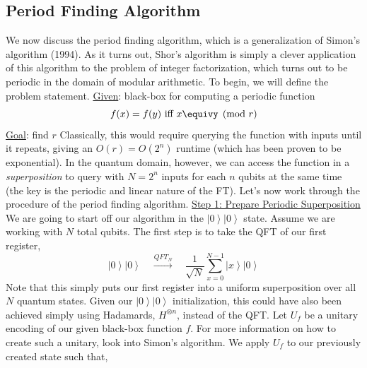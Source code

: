 \documentclass[11pt]{article} %
\newcommand{\ket}[1]{\left|#1\right\rangle}
\begin{document}
\subsection{Period Finding Algorithm}
We now discuss the period finding algorithm, which is a generalization of Simon's algorithm (1994). As it turns out, Shor's algorithm is simply a clever application of this algorithm to the problem of integer factorization, which turns out to be periodic in the domain of modular arithmetic. To begin, we will define the problem statement.
\newline\newline
\underline{Given}: black-box for computing a periodic function
\begin{equation*}
    f(x)=f(y) \text{ iff } x\equivy \pmod r
\end{equation*}
\underline{Goal}: find $r$
\newline\newline 
Classically, this would require querying the function with inputs until it repeats, giving an $O(r)=O(2^n)$ runtime (which has been proven to be exponential). In the quantum domain, however, we can access the function in a \textit{superposition} to query with $N=2^n$ inputs for each $n$ qubits at the same time (the key is the periodic and linear nature of the FT).
\newline\newline
Let's now work through the procedure of the period finding algorithm.
\newline\newline
\underline{Step 1: Prepare Periodic Superposition}
\newline\newline
We are going to start off our algorithm in the $\ket{0}\ket{0}$ state. Assume we are working with $N$ total qubits. The first step is to take the QFT of our first register,
\begin{equation*}
    \ket{0}\ket{0} \quad \overset{QFT_N}{\longrightarrow} \quad \frac{1}{\sqrt{N}}\sum_{x=0}^{N-1}\ket{x}\ket{0}
\end{equation*}
Note that this simply puts our first register into a uniform superposition over all $N$ quantum states. Given our $\ket{0}\ket{0}$ initialization, this could have also been achieved simply using Hadamards, $H^{\otimes n}$, instead of the QFT. 
\newline\newline
Let $U_f$ be a unitary encoding of our given black-box function $f$. For more information on how to create such a unitary, look into Simon's algorithm. We apply $U_f$ to our previously created state such that,
\end{document}
